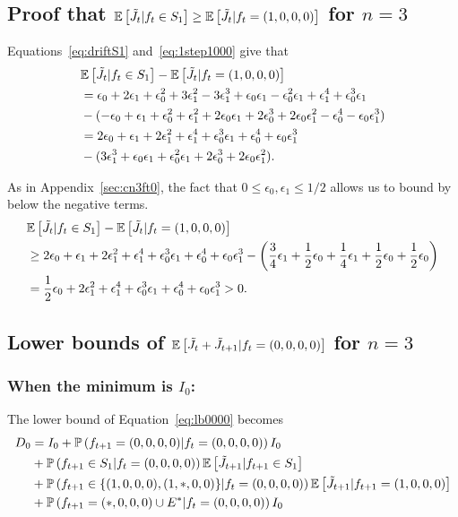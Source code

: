 \documentclass[11pt]{article}
\theoremstyle{plain}
\theoremstyle{definition}
\theoremstyle{remark}
\newcommand{\prob}[1]{\mathbb{P}\left( #1 \right)}
\newcommand{\esp}[1]{\mathbb{E}\left[ #1 \right]}
\begin{document}
\subsection{Proof that $\esp{\Tilde{J}_t | f_t \in S_1 } \geq \esp{\Tilde{J}_t | f_t = (1,0,0,0)}$ for $n=3$} 
\label{sec:cn3ft1}
Equations~\eqref{eq:driftS1} and~\eqref{eq:1step1000} give that
\begin{align*}
& \esp{\Tilde{J}_t | f_t \in S_1 } - \esp{\Tilde{J}_t | f_t = (1,0,0,0)}\\
& = \epsilon_0+2\epsilon_1 + \epsilon_0^2 + 3 \epsilon_1^2 - 3 \epsilon_1^3 + \epsilon_0 \epsilon_1 - \epsilon_0^2 \epsilon_1 + \epsilon_1^4 + \epsilon_0^3 \epsilon_1 \\
& - (-\epsilon_0 + \epsilon_1 + \epsilon_0^2 + \epsilon_1^2 + 2 \epsilon_0 \epsilon_1 + 2 \epsilon_0^3 + 2 \epsilon_0 \epsilon_1^2 - \epsilon_0^4 - \epsilon_0 \epsilon_1^3)\\
& = 2 \epsilon_0 + \epsilon_1 + 2 \epsilon_1^2 + \epsilon_1^4 + \epsilon_0^3 \epsilon_1 + \epsilon_0^4 + \epsilon_0 \epsilon_1^3\\
& - (3 \epsilon_1^3 +\epsilon_0\epsilon_1 + \epsilon_0^2 \epsilon_1 + 2 \epsilon_0^3 + 2 \epsilon_0 \epsilon_1^2 ).
\end{align*}

As in Appendix~\ref{sec:cn3ft0}, the fact that $0 \leq \epsilon_0, \epsilon_1 \leq 1/2$ allows us to bound by below the negative terms.
\begin{align*}
& \esp{\Tilde{J}_t | f_t \in S_1 } - \esp{\Tilde{J}_t | f_t = (1,0,0,0)}\\
& \geq 2 \epsilon_0 + \epsilon_1 + 2 \epsilon_1^2 + \epsilon_1^4 + \epsilon_0^3 \epsilon_1 + \epsilon_0^4 + \epsilon_0 \epsilon_1^3 - \left(\frac{3}{4} \epsilon_1 +\frac{1}{2}\epsilon_0 + \frac{1}{4}\epsilon_1 + \frac{1}{2} \epsilon_0 + \frac{1}{2} \epsilon_0 \right)\\
& =  \frac{1}{2} \epsilon_0 + 2 \epsilon_1^2 + \epsilon_1^4 + \epsilon_0^3 \epsilon_1 + \epsilon_0^4 + \epsilon_0 \epsilon_1^3 > 0.
\end{align*}


\subsection{Lower bounds of $\esp{\Tilde{J}_{t} + \Tilde{J}_{t+1} | f_t = (0,0,0,0)}$ for $n=3$} \label{sec:lb2n30000}
\subsubsection{When the minimum is $I_0$:}
The lower bound of Equation~\eqref{eq:lb0000} becomes
\begin{align*}
D_0 & = I_0 \nonumber + \prob{f_{t+1}=(0,0,0,0) |f_t=(0,0,0,0)} I_0 \nonumber \\
& + \prob{f_{t+1} \in S_1 | f_t = (0,0,0,0)} \esp{\Tilde{J}_{t+1}| f_{t+1} \in S_1} \nonumber \\
& + \prob{f_{t+1} \in \{(1,0,0,0),(1,*,0,0)\} |f_t=(0,0,0,0)} \esp{\Tilde{J}_{t+1}|f_{t+1}=(1,0,0,0)} \nonumber\\
& + \prob{f_{t+1}=(*,0,0,0) \cup E^* |f_t=(0,0,0,0)} I_0
\end{align*}
\end{document}
